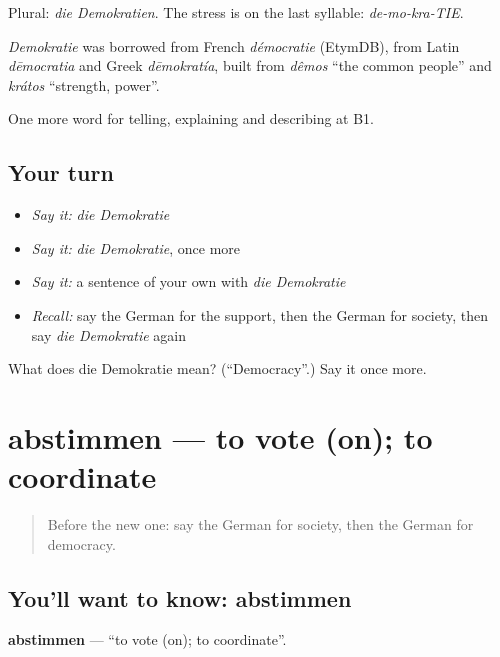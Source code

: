 Plural: \emph{die Demokratien}. The stress is on the last syllable: \emph{de-mo-kra-TIE}.

\begin{cousinweb}
\emph{Demokratie} was borrowed from French \emph{démocratie} (EtymDB), from Latin \emph{dēmocratia} and Greek \emph{dēmokratía}, built from \emph{dêmos} \textquotedblleft{}the common people\textquotedblright{} and \emph{krátos} \textquotedblleft{}strength, power\textquotedblright{}.
\end{cousinweb}

\begin{grammarlens}[title={What you've built}]
One more word for telling, explaining and describing at B1.
\end{grammarlens}

\subsection*{Your turn}
\begin{itemize}
\raggedright
  \item \emph{Say it:} \emph{die Demokratie}
  \item \emph{Say it:} \emph{die Demokratie}, once more
  \item \emph{Say it:} a sentence of your own with \emph{die Demokratie}
  \item \emph{Recall:} say the German for the support, then the German for society, then say \emph{die Demokratie} again
\end{itemize}

\begin{tcolorbox}[breakable,colback=teal!4,colframe=teal!35!black,title={Before you move on}]
What does die Demokratie mean? (\textquotedblleft{}Democracy\textquotedblright{}.) Say it once more.
\end{tcolorbox}
\section[abstimmen]{abstimmen — to vote (on); to coordinate}

\label{lesson:GE-C358-abstimmen}



\begin{quote}
Before the new one: say the German for society, then the German for democracy.
\end{quote}

\subsection*{You'll want to know: abstimmen}
\textbf{abstimmen} — \textquotedblleft{}to vote (on); to coordinate\textquotedblright{}.

